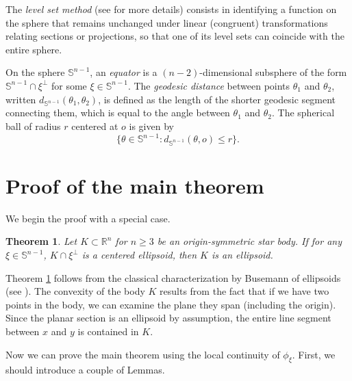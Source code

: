 \documentclass[amsfonts,reqno,11pt]{amsart}
\newtheorem{thm}{Theorem}[section]
\newcommand{\Rn}{\mathbb{R}^n}
\newcommand{\sphere}{\mathbb{S}^{n-1}}
\begin{document}

The {\it level set method} (see \cite{LZh2024, Ryabogin2012, Zh2018} for more details) consists in identifying a function on the sphere that remains unchanged under linear (congruent) transformations relating sections or projections, so that one of its level sets can coincide with the entire sphere.


On the sphere $\sphere$, an {\it equator} is a $(n-2)$-dimensional subsphere of the form $\sphere \cap \xi^\perp$ for some $\xi \in \sphere$. The {\it geodesic distance} between points $\theta_1$ and $\theta_2$, written $d_{\sphere}(\theta_1,\theta_2)$, is defined as the length of the shorter geodesic segment connecting them, which is equal to the angle between $\theta_1$ and $\theta_2$. The spherical ball of radius $r$ centered at $o$ is given by
$$
\{\theta \in \sphere : d_{\sphere}(\theta,o) \leq r\}.
$$



\section{Proof of the main theorem}
We begin the proof with a special case.
\begin{thm}\label{thm 2.1}
    Let $K\subset \Rn$ for $n\geq 3$ be an origin-symmetric star body. If for any $\xi\in\sphere$, $K\cap \xi^\perp$ is a centered ellipsoid, then $K$ is an ellipsoid.
\end{thm}

Theorem \ref{thm 2.1} follows from the classical characterization by Busemann of ellipsoids (see \cite[Theorem 3.1]{Soltan2019}). The convexity of the body $K$ results from the fact that if we have two points in the body, we can examine the plane they span (including the origin). Since the planar section is an ellipsoid by assumption, the entire line segment between $x$ and $y$ is contained in $K$.


Now we can prove the main theorem using the local continuity of $\phi_\xi$. First, we should introduce a couple of Lemmas.
\end{document}
